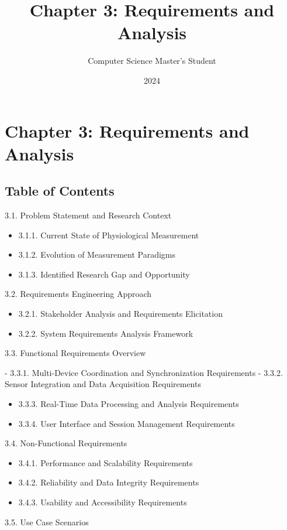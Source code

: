 \documentclass[12pt,a4paper]{article}
\title{Chapter 3: Requirements and Analysis}
\author{Computer Science Master's Student}
\date{2024}
\begin{document}
\maketitle

\section{Chapter 3: Requirements and Analysis}

\subsection{Table of Contents}

3.1. Problem Statement and Research Context

\begin{itemize}
\item 3.1.1. Current State of Physiological Measurement
\item 3.1.2. Evolution of Measurement Paradigms
\item 3.1.3. Identified Research Gap and Opportunity

\end{itemize}
3.2. Requirements Engineering Approach

\begin{itemize}
\item 3.2.1. Stakeholder Analysis and Requirements Elicitation
\item 3.2.2. System Requirements Analysis Framework

\end{itemize}
3.3. Functional Requirements Overview

-
3.3.1. Multi-Device Coordination and Synchronization Requirements
-
3.3.2. Sensor Integration and Data Acquisition Requirements
\begin{itemize}
\item 3.3.3. Real-Time Data Processing and Analysis Requirements
\item 3.3.4. User Interface and Session Management Requirements

\end{itemize}
3.4. Non-Functional Requirements

\begin{itemize}
\item 3.4.1. Performance and Scalability Requirements
\item 3.4.2. Reliability and Data Integrity Requirements
\item 3.4.3. Usability and Accessibility Requirements

\end{itemize}
3.5. Use Case Scenarios
\end{document}
